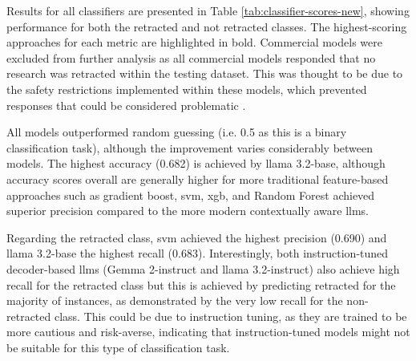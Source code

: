 \documentclass[pdflatex,sn-mathphys-num]{sn-jnl}%
\begin{document}
Results for all classifiers are presented in Table \ref{tab:classifier-scores-new}, showing performance for both the retracted and not retracted classes. The highest-scoring approaches for each metric are highlighted in bold. Commercial models were excluded from further analysis as all commercial models responded that no research was retracted within the testing dataset. This was thought to be due to the safety restrictions implemented within these models, which prevented responses that could be considered problematic \cite{bai2022constitutionalaiharmlessnessai}. 


All models outperformed random guessing (i.e. 0.5 as this is a binary classification task), although the improvement varies considerably between models. The highest accuracy (0.682) is achieved by \gls*{llama} 3.2-base, although accuracy scores overall are generally higher for more traditional feature-based approaches such as gradient boost, \gls*{svm}, \gls*{xgb}, and Random Forest achieved superior precision compared to the more modern contextually aware \glspl*{llm}.

Regarding the retracted class, \gls*{svm} achieved the highest precision (0.690) and \gls*{llama} 3.2-base the highest recall (0.683). Interestingly, both instruction-tuned decoder-based \glspl*{llm} (Gemma 2-instruct and \gls*{llama} 3.2-instruct) also achieve high recall for the retracted class but this is achieved by predicting retracted for the majority of instances, as demonstrated by the very low recall for the non-retracted class. This could be due to instruction tuning, as they are trained to be more cautious and risk-averse, indicating that instruction-tuned models might not be suitable for this type of classification task. 
\end{document}
